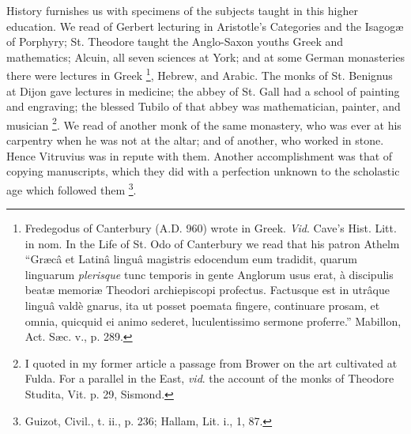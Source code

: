 History furnishes us with specimens of the subjects taught in this
higher education. We read of Gerbert lecturing in Aristotle's
Categories and the Isagogæ of Porphyry; St. Theodore taught the
Anglo-Saxon youths Greek and mathematics; Alcuin, all seven sciences
at York; and at some German monasteries there were lectures in Greek \footnote{Fredegodus of
Canterbury (A.D. 960) wrote in Greek. \emph{Vid}.
Cave's Hist. Litt. in nom. In the Life of St. Odo of Canterbury we
read that his patron Athelm ``Græcâ et Latinâ linguâ magistris
edocendum eum tradidit, quarum linguarum \emph{plerisque} tunc
temporis in gente Anglorum usus erat, à discipulis beatæ memoriæ
Theodori archiepiscopi profectus. Factusque est in utrâque linguâ
valdè gnarus, ita ut posset poemata fingere, continuare prosam, et
omnia, quicquid ei animo sederet, luculentissimo sermone proferre.''
Mabillon, Act. Sæc. v., p. 289.}, Hebrew, and Arabic. The monks of St. Benignus at Dijon gave
lectures in medicine; the abbey of St. Gall had a school of painting
and engraving; the blessed Tubilo of that abbey was
mathematician, painter, and musician \footnote{I quoted in
my former article a passage from Brower on the art cultivated at Fulda.
For a parallel in the East, \emph{vid}. the account of the monks of
Theodore Studita, Vit. p. 29, Sismond.}. We read of another monk of the same monastery, who was ever
at his carpentry when he was not at the altar; and of another, who
worked in stone. Hence Vitruvius was in repute with them. Another
accomplishment was that of copying manuscripts, which they did with a
perfection unknown to the scholastic age which followed them \footnote{Guizot,
Civil., t. ii., p. 236; Hallam, Lit. i., 1, 87.}.

